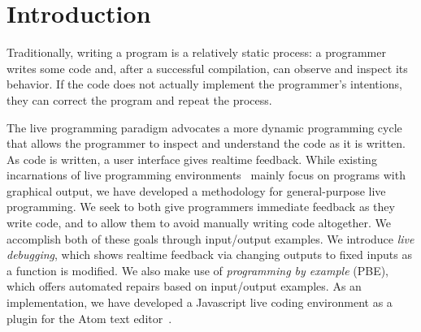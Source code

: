 \section{Introduction}
\label{sec:intro}


Traditionally, writing a program is a relatively static process: a programmer writes some code and, after a successful compilation, can observe and inspect its behavior. If the code does not actually implement the programmer's intentions, they can correct the program and repeat the process.

The live programming paradigm advocates a more dynamic programming cycle that allows the programmer to inspect and understand the code as it is written. As code is written, a user interface gives realtime feedback.  While existing incarnations of live programming environments~\cite{chugh2016programmatic} mainly focus on programs with graphical output, we have developed a methodology for general-purpose live programming.
We seek to both give programmers immediate feedback as they write code,
and to allow them to avoid manually writing code altogether.
We accomplish both of these goals through input/output examples.
We introduce \textit{live debugging}, which shows realtime feedback via changing outputs to fixed inputs as a function is modified. We also make use of \textit{programming by example} (PBE), which offers automated repairs based on input/output examples. 
As an implementation, we have developed a Javascript live coding environment as a plugin for the Atom text editor~\cite{Atom}.




